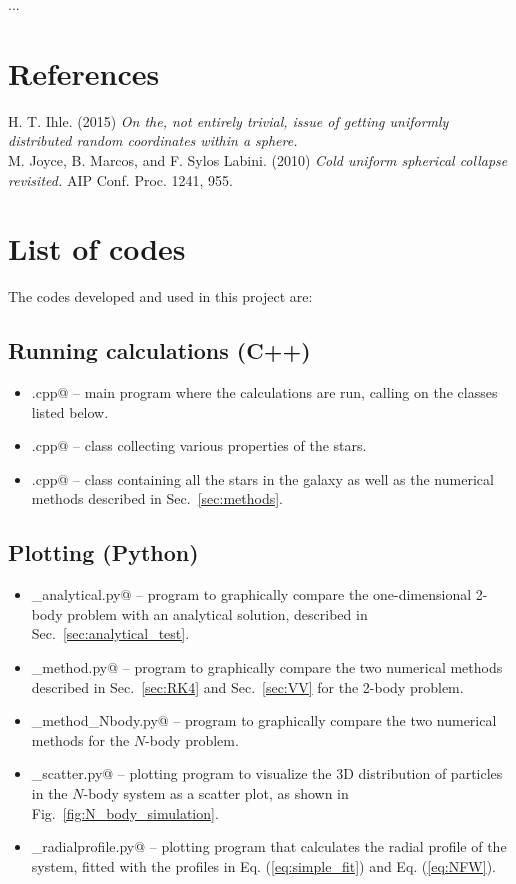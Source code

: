 \documentclass{article}
\begin{document}
\begin{multicols}{2}
...


\section{References}

H. T. Ihle. (2015) \textit{On the, not entirely trivial, issue of getting uniformly distributed random coordinates within a sphere.} \\

\noindent M. Joyce, B. Marcos, and F. Sylos Labini. (2010) \textit{Cold uniform spherical collapse revisited.} AIP Conf. Proc. 1241, 955.



\section{List of codes}

The codes developed and used in this project are: 


\subsection{Running calculations (C++)}

\begin{itemize}
	\item \verb@main.cpp@ -- main program where the calculations are run, calling on the classes listed below. 
	\item \verb@star.cpp@ -- class collecting various properties of the stars.
	\item \verb@galaxy.cpp@ -- class containing all the stars in the galaxy as well as the numerical methods described in Sec.~\ref{sec:methods}.
\end{itemize}


\subsection{Plotting (Python)}

\begin{itemize}
	\item \verb@plotting_analytical.py@ -- program to graphically compare the one-dimensional 2-body problem with an analytical solution, described in Sec.~\ref{sec:analytical_test}.
	\item \verb@plot_method.py@ -- program to graphically compare the two numerical methods described in Sec.~\ref{sec:RK4} and Sec.~\ref{sec:VV} for the 2-body problem.
	\item \verb@plot_method_Nbody.py@ -- program to graphically compare the two numerical methods for the $N$-body problem.
	\item \verb@plotting_scatter.py@ -- plotting program to visualize the 3D distribution of particles in the $N$-body system as a scatter plot, as shown in Fig.~\ref{fig:N_body_simulation}. 
	\item \verb@plotting_radialprofile.py@ -- plotting program that calculates the radial profile of the system, fitted with the profiles in Eq. (\ref{eq:simple_fit}) and Eq. (\ref{eq:NFW}).
\end{itemize}




\end{multicols}
\end{document}
